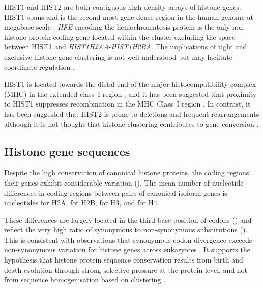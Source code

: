 	HIST1 and HIST2 are both contiguous high density arrays of histone genes. 
	HIST1 spans \HISTOneSpan{} 
	and is the second most gene dense region in the human genome at megabase scale \citep{MHC-III-analysis}.
	\textit{HFE} encoding the hemochromatosis protein \citep{AlbigDoenecke1998} 
	is the only non-histone protein coding gene located within the cluster
	excluding the space between HIST1 and \textit{HIST1H2AA}-\textit{HIST1H2BA}. 
	The implications of tight and exclusive histone gene clustering 
	is not well understood \citep{Eirinlopez2009} 
	but may faciltate coordinate regulation \citep{close-regulators}.

	HIST1 is located towards the distal end of the major histocompatibility complex (MHC) 
	in the extended class~I region \citep{MHC-I-transcript, MHC-complete-sequencing-1999}, 
	and it has been suggested that proximity to HIST1 
	suppresses recombination in the MHC Class~I region \citep{MHC-repressed-by-HIST}. 
	In contrast, it has been suggested that HIST2 is prone to 
	deletions and frequent rearrangements \citep{HISTTwo-prone-deletion-discovery, HISTTwo-prone-deletion-focus}
	although it is not thought that histone clustering contributes to gene conversion \citep{NeiRooney2005}.

\subsection{Histone gene sequences}
	Despite the high conservation of canonical histone proteins, 
	the coding regions their genes exhibit considerable variation (). 
	The mean number of nucleotide differences in coding regions between pairs of canonical isoform genes is 
	 nucleotides for H2A, 
	 for H2B, 
	 for H3, 
	and  for H4.

	These differences are largely located in the third base position of codons ()
	and reflect the very high ratio of synonymous to non-synonymous substitutions ().
	This is consistent with observations that 
	synonymous codon divergence exceeds non-synonymous variation 
	for histone genes across eukaryotes \citep{Piontkivska2002, Rooney2002}. 
	It supports the hypothesis that histone protein sequence conservation 
	results from birth and death evolution through strong selective pressure at the protein level, 
	and not from sequence homogenisation based on clustering \citep{NeiRooney2005}.

